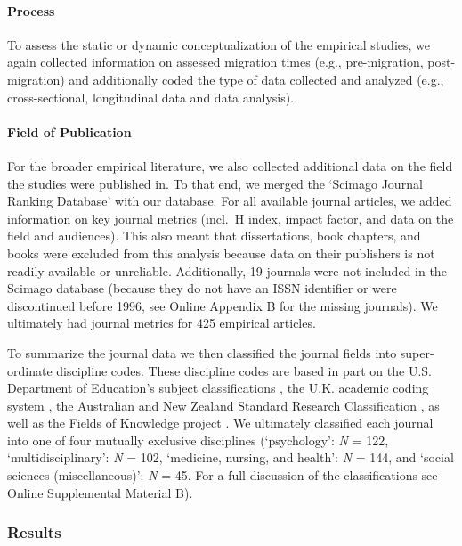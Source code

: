 \paragraph{Process}

To assess the static or dynamic conceptualization of the empirical
studies, we again collected information on assessed migration times
(e.g., pre-migration, post-migration) and additionally coded the type of
data collected and analyzed (e.g., cross-sectional, longitudinal data
and data analysis).

\paragraph{Field of Publication}

For the broader empirical literature, we also collected additional data
on the field the studies were published in. To that end, we merged the
`Scimago Journal Ranking Database' \citep{SCImago2020} with our
database. For all available journal articles, we added information on
key journal metrics (incl.~H index, impact factor, and data on the field
and audiences). This also meant that dissertations, book chapters, and
books were excluded from this analysis because data on their publishers
is not readily available or unreliable. Additionally, 19 journals were
not included in the Scimago database (because they do not have an ISSN
identifier or were discontinued before 1996, see Online Appendix B for
the missing journals). We ultimately had journal metrics for 425
empirical articles.

To summarize the journal data we then classified the journal fields into
super-ordinate discipline codes. These discipline codes are based in
part on the U.S. Department of Education's subject classifications
\citep[i.e., CIP,][]{InstituteofEducationSciences2020}, the U.K.
academic coding system
\citep[JACS 3.0,][]{HigherEducationStatisticsAgency2013}, the Australian
and New Zealand Standard Research Classification
\citep[ANZSRC 2020,][]{AustralianBureauofStatistics2020}, as well as the
Fields of Knowledge project \citep{ThingsmadeThinkable2014}. We
ultimately classified each journal into one of four mutually exclusive
disciplines (`psychology': \textit{N} = 122, `multidisciplinary':
\textit{N} = 102, `medicine, nursing, and health': \textit{N} = 144, and
`social sciences (miscellaneous)': \textit{N} = 45. For a full
discussion of the classifications see Online Supplemental Material B).

\subsubsection{Results}


